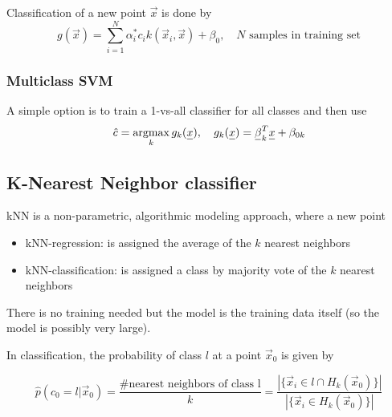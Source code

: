 Classification of a new point $\vec{x}$ is done by
\begin{equation}
    g(\vec{x}) = \sum_{i=1}^N \alpha_i^* c_i k(\vec{x}_i, \vec{x}) + \beta_0, \quad N \text{ samples in training set}
\end{equation}

\subsubsection{Multiclass SVM}
A simple option is to train a 1-vs-all classifier for all classes and then use
\begin{equation}
    \hat{c} = \argmax_k g_k(\vec{x}), \quad g_k(\vec{x}) = \vec{\beta}_k^T \vec{x} + \beta_{0k}
\end{equation}



\subsection{K-Nearest Neighbor classifier}
kNN is a non-parametric, algorithmic modeling approach, where a new point
\begin{itemize}
    \item kNN-regression: is assigned the average of the $k$ nearest neighbors
    \item kNN-classification: is assigned a class by majority vote of the $k$ nearest neighbors
\end{itemize}
There is \textcolor{green1}{no training needed} but the \textcolor{red1}{model is the training data itself (so the model is possibly very large)}.

In classification, the probability of class $l$ at a point $\vec{x}_0$ is given by

\begin{equation}
    \hat{p}(c_0 = l|\vec{x}_0) = \frac{\# \text{nearest neighbors of class l}}{k} = \frac{|\{ \vec{x}_i \in l \cap H_k(\vec{x}_0) \}|}{|\{ \vec{x}_i \in H_k(\vec{x}_0) \}|}
\end{equation}

